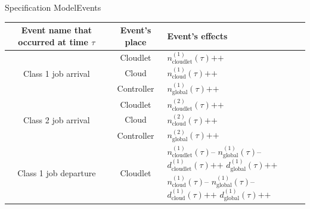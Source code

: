 \documentclass[10pt]{beamer}
\begin{document}
\begin{frame}{Specification Model}{Events}

\begin{table}[h!]
    \begin{adjustbox}{center=\textwidth, height=105pt}
     \begin{tabular}{c|c|p{2.5cm}}

      \toprule
      \textbf{Event name that occurred at time $\tau$} & \textbf{Event's place} & \textbf{Event's effects} \\
      \midrule
      
      \multirow{3}{*}{Class 1 job arrival} & Cloudlet & $n_{\text{cloudlet}}^{(1)}(\tau)\texttt{++}$ \\ \cline{2-3} 
      & Cloud & $n_{\text{cloud}}^{(1)}(\tau)\texttt{++}$ \\ \cline{2-3} 
      & Controller & $n_{\text{global}}^{(1)}(\tau)\texttt{++}$ \\ 
       
      \hline
       
      \multirow{3}{*}{Class 2 job arrival} & Cloudlet & $n_{\text{cloudlet}}^{(2)}(\tau)\texttt{++}$ \\ \cline{2-3} 
      & Cloud & $n_{\text{cloud}}^{(2)}(\tau)\texttt{++}$ \\ \cline{2-3} 
      & Controller & $n_{\text{global}}^{(2)}(\tau)\texttt{++}$ \\ 
    
	  \hline
       
      \multirow{8}{*}{Class 1 job departure} & \multirow{4}{*}{Cloudlet} & $n_{\text{cloudlet}}^{(1)}(\tau)\texttt{--}$ \newline $n_{\text{global}}^{(1)}(\tau)\texttt{--}$ \newline $d_{\text{cloudlet}}^{(1)}(\tau)\texttt{++}$ \newline $d_{\text{global}}^{(1)}(\tau)\texttt{++}$ \\ \cline{2-3} 
      & \multirow{4}{*}{Cloud} & $n_{\text{cloud}}^{(1)}(\tau)\texttt{--}$ \newline $n_{\text{global}}^{(1)}(\tau)\texttt{--}$ \newline $d_{\text{cloud}}^{(1)}(\tau)\texttt{++}$ \newline $d_{\text{global}}^{(1)}(\tau)\texttt{++}$ \\ \cline{2-3} 
 
 		\hline
       

\end{tabular}
\end{adjustbox}
\end{table}
\end{frame}
\end{document}
